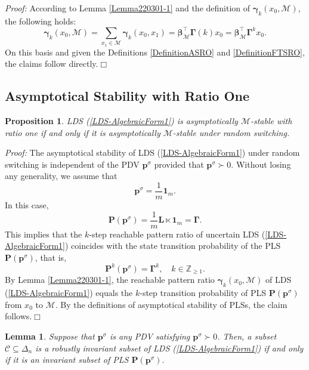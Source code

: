 \documentclass[11pt,onecolumn]{article}
\newtheorem{proposition}{Proposition}
\newtheorem{lemma}{Lemma}
\begin{document}
{\it Proof:}  According to Lemma \ref{Lemma220301-1} and the definition of $\boldsymbol\gamma_k(x_0,\mathcal M)$, the following holds:
\[\boldsymbol\gamma_k(x_0,\mathcal M)=\sum_{x_1\in\mathcal M} \boldsymbol\gamma_k(x_0,x_1)=\boldsymbol\beta_{\mathcal M}^\top\boldsymbol\Gamma(k)x_0=\boldsymbol\beta_{\mathcal M}^\top\boldsymbol\Gamma^kx_0.\]
On this basis and given the Definitions \ref{DefinitionASRO} and \ref{DefinitionFTSRO}, the claims follow directly.\hfill$\Box$




\subsection{Asymptotical Stability with Ratio One}





\begin{proposition}\label{Prop220320-1}
 LDS (\ref{LDS-AlgebraicForm1}) is asymptotically $\mathcal M$-stable with ratio one if and only if it is asymptotically $\mathcal M$-stable under random switching.



\end{proposition}

{\it Proof:} The asymptotical stability of  LDS (\ref{LDS-AlgebraicForm1}) under random switching is independent of the PDV $\boldsymbol p^\sigma$ provided that $\boldsymbol p^\sigma\succ0$. Without losing any generality, we assume that \[\boldsymbol p^\sigma=\frac{1}{m}\mathbf 1_m.\]
In this case,
\[\mathbf P(\boldsymbol p^\sigma)= \frac{1}{m} \mathbf L\ltimes \mathbf 1_m =\boldsymbol\Gamma.\]
This implies that the $k$-step reachable pattern ratio of uncertain LDS (\ref{LDS-AlgebraicForm1}) coincides with the state transition probability of the PLS $\mathbf P(\boldsymbol p^\sigma)$, that is,
\[\mathbf P^k(\boldsymbol p^\sigma)=\boldsymbol \Gamma^k,\quad k\in\mathbb Z_{\geq1}.\]
 By Lemma \ref{Lemma220301-1}, the reachable pattern ratio $\boldsymbol\gamma_k(x_0,\mathcal M)$ of LDS (\ref{LDS-AlgebraicForm1}) equals the $k$-step transition probability of PLS $\mathbf P(\boldsymbol p^\sigma)$ from $x_0$ to $\mathcal M$. By the definitions of asymptotical stability of PLSs, the claim follows.\hfill $\Box$

\begin{lemma}\label{Lemma220320-1}
Suppose that $\boldsymbol p^\sigma$ is any PDV satisfying
$\boldsymbol p^\sigma\succ0$. Then, a subset $\mathcal C\subseteq\Delta_n$ is a robustly invariant subset of LDS (\ref{LDS-AlgebraicForm1}) if and only if it is an invariant subset of PLS $\mathbf P(\boldsymbol p^\sigma)$.
\end{lemma}
\end{document}
